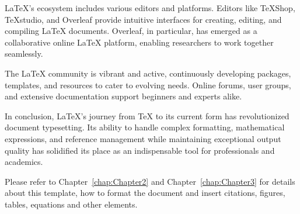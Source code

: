 LaTeX's ecosystem includes various editors and platforms. Editors like TeXShop, TeXstudio, and Overleaf provide intuitive interfaces for creating, editing, and compiling LaTeX documents. Overleaf, in particular, has emerged as a collaborative online LaTeX platform, enabling researchers to work together seamlessly.

The LaTeX community is vibrant and active, continuously developing packages, templates, and resources to cater to evolving needs. Online forums, user groups, and extensive documentation support beginners and experts alike.

In conclusion, LaTeX's journey from TeX to its current form has revolutionized document typesetting. Its ability to handle complex formatting, mathematical expressions, and reference management while maintaining exceptional output quality has solidified its place as an indispensable tool for professionals and academics.

Please refer to Chapter~\ref{chap:Chapter2} and Chapter~\ref{chap:Chapter3} for details about this template, how to format the document and insert citations, figures, tables, equations and other elements.